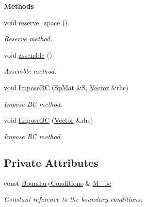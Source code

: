 \begin{Indent}{\bf Methods}\par
\begin{DoxyCompactItemize}
\item 
void \hyperlink{classFVCode3D_1_1global__InnerProduct_ad0aeb15cd9fffc009025e5bb5e4ed5b4}{reserve\+\_\+space} ()
\begin{DoxyCompactList}\small\item\em Reserve method. \end{DoxyCompactList}\item 
void \hyperlink{classFVCode3D_1_1global__InnerProduct_acc444616cd8702b28bf2337c6dc7b059}{assemble} ()
\begin{DoxyCompactList}\small\item\em Assemble method. \end{DoxyCompactList}\item 
void \hyperlink{classFVCode3D_1_1global__InnerProduct_a708f68bfd33ad98c55d64c0098733fed}{Impose\+BC} (\hyperlink{namespaceFVCode3D_ac1032289d96638cf0ad6c52ef639095f}{Sp\+Mat} \&S, \hyperlink{namespaceFVCode3D_a16ccf345652402bccd1a5d2e6782526c}{Vector} \&rhs)
\begin{DoxyCompactList}\small\item\em Impose BC method. \end{DoxyCompactList}\item 
void \hyperlink{classFVCode3D_1_1global__InnerProduct_ad5a02ae913446383b521c1b15a9fb11a}{Impose\+BC} (\hyperlink{namespaceFVCode3D_a16ccf345652402bccd1a5d2e6782526c}{Vector} \&rhs)
\begin{DoxyCompactList}\small\item\em Impose BC method. \end{DoxyCompactList}\end{DoxyCompactItemize}
\end{Indent}
\subsection*{Private Attributes}
\begin{DoxyCompactItemize}
\item 
const \hyperlink{classFVCode3D_1_1BoundaryConditions}{Boundary\+Conditions} \& \hyperlink{classFVCode3D_1_1global__InnerProduct_a62bbb87bc4710a73980603b8b77ffda8}{M\+\_\+bc}
\begin{DoxyCompactList}\small\item\em Constant reference to the boundary conditions. \end{DoxyCompactList}\end{DoxyCompactItemize}
